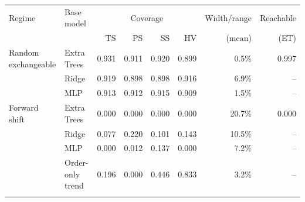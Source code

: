 \begin{tabular}{@{}llrrrrrr@{}}
\toprule
Regime & Base model & \multicolumn{4}{c}{Coverage} & Width/range & Reachable \\
\cmidrule(lr){3-6}
 & & TS & PS & SS & HV & (mean) & (ET) \\
\midrule
Random exchangeable & Extra Trees & 0.931 & 0.911 & 0.920 & 0.899 & 0.5\% & 0.997 \\
 & Ridge & 0.919 & 0.898 & 0.898 & 0.916 & 6.9\% & -- \\
 & MLP & 0.913 & 0.912 & 0.915 & 0.909 & 1.5\% & -- \\
\addlinespace[2pt]
Forward shift & Extra Trees & 0.000 & 0.000 & 0.000 & 0.000 & 20.7\% & 0.000 \\
 & Ridge & 0.077 & 0.220 & 0.101 & 0.143 & 10.5\% & -- \\
 & MLP & 0.000 & 0.012 & 0.137 & 0.000 & 7.2\% & -- \\
 & Order-only trend & 0.196 & 0.000 & 0.446 & 0.833 & 3.2\% & -- \\
\addlinespace[2pt]
\bottomrule
\end{tabular}
